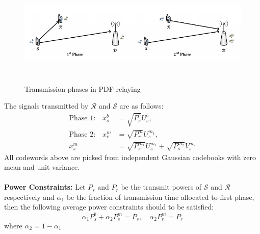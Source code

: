 \begin{figure}[h]
	\centering \vspace{-0.1in}
	\includegraphics[height = 2in,width=5in,angle=00]{images/pdfRelaying.png}
	\vspace{-20pt} 
	\caption[Transmission phases in PDF relaying]{\small Transmission phases in PDF relaying\footnotemark}
	\label{fig:sysModel}
\end{figure}
The signals transmitted by $\mathcal{R}$ and $\mathcal{S}$ are as follows:
\begin{align}
\text{Phase 1:}\quad x^b_s &= \sqrt{P_s^b} U_s^b, \label{eq:tranSig1}\\
\text{Phase 2:}\quad x_r^m &= \sqrt{P_r^m}U_s^{m_1}, \label{eq:tranSig2}\\ 
 x^m_s &= \sqrt{P_s^{m_1}}U_s^{m_1} + \sqrt{P_s^{m_2}}V_s^{m_2} \label{eq:tranSig3}
\end{align}
All codewords above are picked from independent Gaussian codebooks with zero mean and unit variance. \\ \\
\textbf{Power Constraints:} Let $P_s$ and $P_r$ be the transmit powers of $\mathcal{S}$ and $\mathcal{R}$ respectively and $\alpha_1$ be the fraction of transmission time allocated to first phase, then the following average power constraints should to be satisfied:
\begin{equation}
\alpha_1 P_s^b + \alpha_2 P_s^m = P_s,\quad \alpha_2P_r^m = P_r
\end{equation}
where $\alpha_2 = 1-\alpha_1$

